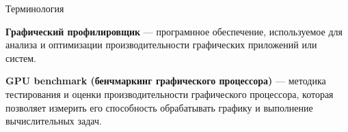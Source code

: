 \documentclass{beamer}
\begin{document}
\begin{frame}{Терминология}
{	\textbf{Графический профилировщик} --- програмнное обеспечение, используемое для анализа и оптимизации производительности графических приложений или систем. 
	
	\textbf{GPU benchmark (бенчмаркинг графического процессора)} --- методика тестирования и оценки производительности графического процессора, которая позволяет измерить его способность обрабатывать графику и выполнение вычислительных задач. 
}
\end{frame}
\end{document}
